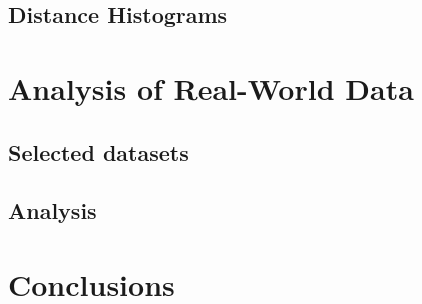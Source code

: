 \documentclass[11pt,oneside]{report}
\theoremstyle{definition}
\begin{document}


\section{Distance Histograms}



\chapter{Analysis of Real-World Data}

\section{Selected datasets}

\section{Analysis}


\chapter{Conclusions}



\end{document}
